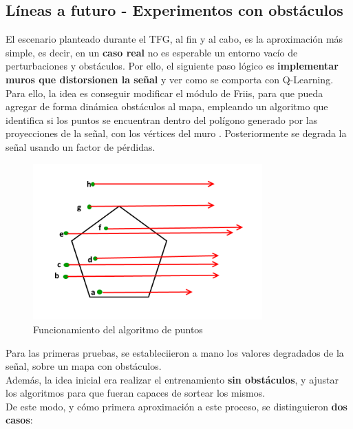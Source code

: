 \subsection{Líneas a futuro - Experimentos con obstáculos}
\label{subsec:experimentos_obstaculos}

El escenario planteado durante el \ac{TFG}, al fin y al cabo, es la aproximación más simple, es decir, en un \textbf{caso real} no es esperable un entorno vacío de perturbaciones y obstáculos. Por ello, el siguiente paso lógico es \textbf{implementar muros que distorsionen la señal} y ver como se comporta con Q-Learning.\\

Para ello, la idea es conseguir modificar el módulo de Friis, para que pueda agregar de forma dinámica obstáculos al mapa, empleando un algoritmo que identifica si los puntos se encuentran dentro del polígono generado por las proyecciones de la señal, con los vértices del muro \cite{poly-info}. Posteriormente se degrada la señal usando un factor de pérdidas.\\

\begin{figure} [H]
    \begin{center}
    \includegraphics[height=6cm]{imagenes/cap4/27_points_poly.png}
    \end{center}
    \caption[Funcionamiento del algoritmo de puntos]{Funcionamiento del algoritmo de puntos}
    \label{fig:poly_algorithm}
\end{figure}

Para las primeras pruebas, se estableciieron a mano los valores degradados de la señal, sobre un mapa con obstáculos.\\

Además, la idea inicial era realizar el entrenamiento \textbf{sin obstáculos}, y ajustar los algoritmos para que fueran capaces de sortear los mismos.\\
\newpage
De este modo, y cómo primera aproximación a este proceso, se distinguieron \textbf{dos casos}:

